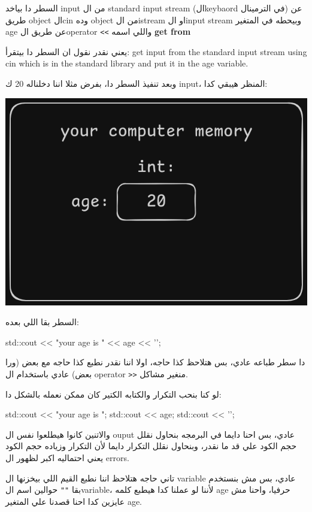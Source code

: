 \documentclass[11pt]{article}
\let\OriginalVerbatim\verbatim
\let\endOriginalVerbatim\endverbatim
\renewenvironment{verbatim}{\begin{english}\OriginalVerbatim}{\endOriginalVerbatim\end{english}}
\begin{document}
السطر دا بياخد input من ال standard input stream (الkeybaord في الترمينال) عن طريق object الcin وده object من الistream او الinput stream وبيحطه في المتغير age عن طريق الoperator \texttt{<{}<{}} واللي اسمه \textbf{get from}

يعني نقدر نقول ان السطر دا بيتقرأ: get input from the standard input stream using cin which is in the standard library and put it in the age variable.

وبعد تنفيذ السطر دا، بفرض مثلا اننا دخلناله 20 ك input، المنظر هيبقي كدا:

\begin{center}
\includegraphics[width=.9\linewidth]{../images/int_variable_not_empty.png}
\end{center}

السطر بقا اللي بعده:

\begin{verbatim}
std::cout << "your age is " << age << '\n';
\end{verbatim}

دا سطر طباعه عادي، بس هتلاحظ كذا حاجه، اولا اننا نقدر نطبع كذا حاجه مع بعض (ورا بعض) عادي باستخدام ال operator \texttt{>{}>{}} منغير مشاكل.

لو كنا بنحب التكرار والكتابه الكتير كان ممكن نعمله بالشكل دا:

\begin{verbatim}
std::cout << "your age is ";
std::cout << age;
std::cout << '\n';
\end{verbatim}

والاتنين كانوا هيطلعوا نفس ال ouput عادي، بس احنا دايما في البرمجه بنحاول نقلل حجم الكود علي قد ما نقدر، وبنحاول نقلل التكرار دايما لأن التكرار وزياده حجم الكود يعني احتماليه اكبر لظهور ال errors.

تاني حاجه هتلاحظ اننا نطبع القيم اللي بيخزنها ال variable عادي، بس مش بنستخدم بقا \texttt{""} حوالين اسم الvariable، لأننا لو عملنا كدا هيطبع كلمه age حرفيا، واحنا مش عايزين كدا احنا قصدنا علي المتغير age.
\end{document}
